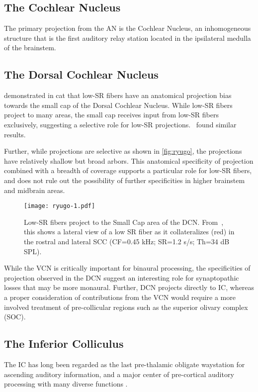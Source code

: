 \subsection{The Cochlear Nucleus} %
\label{sub:the_cochlear_nucleus}
The primary projection from the AN is the Cochlear Nucleus, an inhomogeneous structure that is the first auditory relay station located in the ipsilateral medulla of the brainstem.  
\subsection{The Dorsal Cochlear Nucleus} %
\label{sub:the_dorsal_cochlear_nucleus}
\cite{Ryugo2008Projections} demonstrated in cat that low-SR fibers have an anatomical projection bias towards the small cap of the Dorsal Cochlear Nucleus.  While low-SR fibers project to many areas, the small cap receives input from low-SR fibers exclusively, suggesting a selective role for low-SR projections.~\cite{Liberman1993Central} found similar results. 

Further, while projections are selective as shown in \autoref{fig:ryugo}, the projections have relatively shallow but broad arbors. This anatomical specificity of projection combined with a breadth of coverage supports a particular role for low-SR fibers, and does not rule out the possibility of further specificities in higher brainstem and midbrain areas. 

\begin{figure}[htbp]
	\centering
	\texttt{[image: ryugo-1.pdf]}
	\caption[Low SR Fibers Project to the Small Cap of the DCN]{Low-SR fibers project to the Small Cap area of the DCN.  From~\cite{Ryugo2008Projections}, this shows a lateral view of a low SR fiber as it collateralizes (red) in the rostral and lateral SCC (CF=0.45 kHz; SR=1.2 s/s; Th=34 dB SPL).}
	\label{fig:ryugo}
\end{figure}

While the VCN is critically important for binaural processing, the specificities of projection observed in the DCN suggest an interesting role for synaptopathic losses that may be more monaural.  Further, DCN projects directly to IC, whereas a proper consideration of contributions from the VCN would require a more involved treatment of pre-collicular regions such as the superior olivary complex (SOC). 
\subsection{The Inferior Colliculus} %
\label{sub:the_inferior_colliculus}
The IC has long been regarded as the last pre-thalamic obligate waystation for ascending auditory information, and a major center of pre-cortical auditory processing with many diverse functions \citep{Cant2005Atlas,Covey2008Inputs,Moore1985Projections}.


